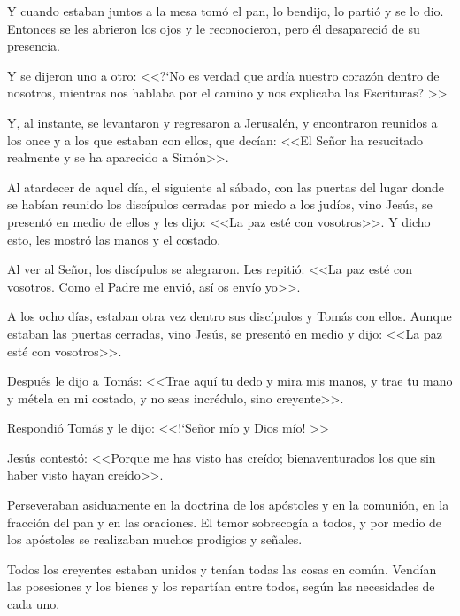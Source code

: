 Y cuando 
estaban juntos a la mesa tomó el pan, lo 
bendijo, lo partió y se lo dio. Entonces se les 
abrieron los ojos y le reconocieron, pero él 
desapareció de su presencia. 

Y se dijeron uno a 
otro: <<?`No es verdad que ardía nuestro 
corazón dentro de nosotros, mientras nos 
hablaba por el camino y nos explicaba las 
Escrituras? >> 

Y, al instante, se levantaron y 
regresaron a Jerusalén, y encontraron reunidos 
a los once y a los que estaban con ellos, que 
decían: <<El Señor ha resucitado realmente y se 
ha aparecido a Simón>>. 


 Al atardecer de aquel día, el siguiente al 
sábado, con las puertas del lugar donde se 
habían reunido los discípulos cerradas por 
miedo a los judíos, vino Jesús, se presentó en 
medio de ellos y les dijo: <<La paz esté con 
vosotros>>. Y dicho esto, les mostró las manos y 
el costado. 

Al ver al Señor, los discípulos se 
alegraron. Les repitió: <<La paz esté con 
vosotros. Como el Padre me envió, así os envío 
yo>>. 


 A los ocho días, estaban otra vez dentro sus 
discípulos y Tomás con ellos. Aunque estaban 
las puertas cerradas, vino Jesús, se presentó en 
medio y dijo: <<La paz esté con vosotros>>. 

Después le dijo a Tomás: <<Trae aquí tu dedo y 
mira mis manos, y trae tu mano y métela en mi 
costado, y no seas incrédulo, sino creyente>>. 

Respondió Tomás y le dijo: <<!`Señor mío y Dios 
mío! >> 

Jesús contestó: <<Porque me has visto 
has creído; bienaventurados los que sin haber 
visto hayan creído>>. 


 Perseveraban asiduamente en la doctrina de 
los apóstoles y en la comunión, en la fracción 
del pan y en las oraciones. El temor sobrecogía 
a todos, y por medio de los apóstoles se 
realizaban muchos prodigios y señales. 

Todos 
los creyentes estaban unidos y tenían todas las 
cosas en común. Vendían las posesiones y los 
bienes y los repartían entre todos, según las 
necesidades de cada uno. 

